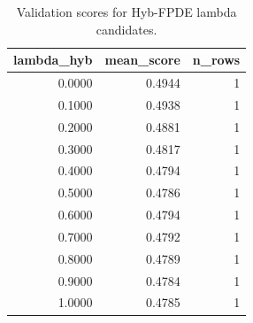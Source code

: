 \begin{table}[t]
\caption{Validation scores for Hyb-FPDE lambda candidates.}
\label{tab:lambda_distribution_computed}
\centering
\begin{tabular}{rrr}
\toprule
lambda\_hyb & mean\_score & n\_rows \\
\midrule
0.0000 & 0.4944 & 1 \\
0.1000 & 0.4938 & 1 \\
0.2000 & 0.4881 & 1 \\
0.3000 & 0.4817 & 1 \\
0.4000 & 0.4794 & 1 \\
0.5000 & 0.4786 & 1 \\
0.6000 & 0.4794 & 1 \\
0.7000 & 0.4792 & 1 \\
0.8000 & 0.4789 & 1 \\
0.9000 & 0.4784 & 1 \\
1.0000 & 0.4785 & 1 \\
\bottomrule
\end{tabular}

\end{table}
